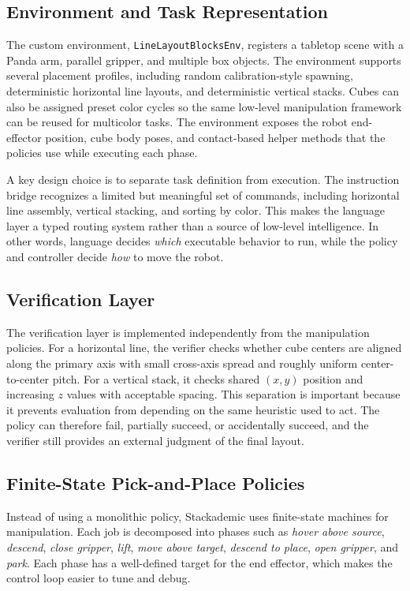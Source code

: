 \documentclass[10pt,letterpaper,twocolumn]{article}
\begin{document}
\subsection{Environment and Task Representation}
The custom environment, \texttt{LineLayoutBlocksEnv}, registers a tabletop scene with a Panda arm, parallel gripper, and multiple box objects. The environment supports several placement profiles, including random calibration-style spawning, deterministic horizontal line layouts, and deterministic vertical stacks. Cubes can also be assigned preset color cycles so the same low-level manipulation framework can be reused for multicolor tasks. The environment exposes the robot end-effector position, cube body poses, and contact-based helper methods that the policies use while executing each phase.

A key design choice is to separate task definition from execution. The instruction bridge recognizes a limited but meaningful set of commands, including horizontal line assembly, vertical stacking, and sorting by color. This makes the language layer a typed routing system rather than a source of low-level intelligence. In other words, language decides \emph{which} executable behavior to run, while the policy and controller decide \emph{how} to move the robot.

\subsection{Verification Layer}
The verification layer is implemented independently from the manipulation policies. For a horizontal line, the verifier checks whether cube centers are aligned along the primary axis with small cross-axis spread and roughly uniform center-to-center pitch. For a vertical stack, it checks shared $(x,y)$ position and increasing $z$ values with acceptable spacing. This separation is important because it prevents evaluation from depending on the same heuristic used to act. The policy can therefore fail, partially succeed, or accidentally succeed, and the verifier still provides an external judgment of the final layout.

\subsection{Finite-State Pick-and-Place Policies}
Instead of using a monolithic policy, Stackademic uses finite-state machines for manipulation. Each job is decomposed into phases such as \textit{hover above source}, \textit{descend}, \textit{close gripper}, \textit{lift}, \textit{move above target}, \textit{descend to place}, \textit{open gripper}, and \textit{park}. Each phase has a well-defined target for the end effector, which makes the control loop easier to tune and debug.
\end{document}
